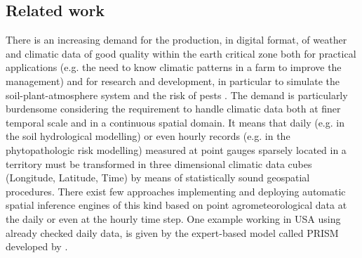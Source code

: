 \documentclass[authoryear,preprint,review,12pt]{elsarticle}
\newcommand{\note}[1]{\emph{\textcolor{red}{#1}}}
\begin{document}
\subsection{Related work}
There is an increasing demand for the production, in digital format, of weather and climatic data of good quality within the earth critical zone both 
    for practical applications (e.g. the need to know climatic patterns in a farm to improve the management)
    and
    for research and development, in particular to simulate the soil-plant-atmosphere system \citep{Hoogenboom:agrometeo-swat:2000,Jones:swat:2003,Seneviratne:swat:2010} %
    and the risk of pests \citep{Orlandini:plasmopara:2008,Rossi:vitenet:2014}.
The demand is particularly burdensome considering the requirement to handle climatic data both at finer temporal scale and in a continuous spatial domain.
It means that daily (e.g. in the soil hydrological modelling) or even hourly records (e.g. in the phytopathologic risk modelling) measured at point gauges sparsely located in a territory must be transformed in three dimensional climatic data cubes (Longitude, Latitude, Time) by means of statistically sound geospatial procedures.
There exist few approaches implementing and deploying automatic spatial inference engines of this kind based on point agrometeorological data at the daily or even at the hourly time step.
One example working in USA using already checked daily data, is given by the expert-based model called PRISM developed by  \cite{Daly08_PRISM_USA}. %
\end{document}
